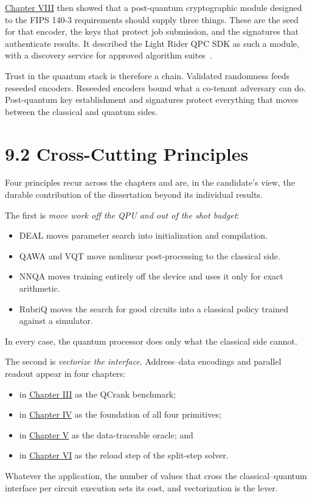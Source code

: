 \documentclass{report}
\theoremstyle{plain}
\theoremstyle{definition}
\theoremstyle{remark}
\begin{document}
\hyperref[ch:pqc]{Chapter VIII} then showed that a post-quantum cryptographic module designed to the FIPS 140-3 requirements should supply three things. These are the seed for that encoder, the keys that protect job submission, and the signatures that authenticate results. It described the Light Rider QPC SDK as such a module, with a discovery service for approved algorithm suites~\cite{guo2026lightriderqpc}.

Trust in the quantum stack is therefore a chain. Validated randomness feeds reseeded encoders. Reseeded encoders bound what a co-tenant adversary can do. Post-quantum key establishment and signatures protect everything that moves between the classical and quantum sides.

\section{9.2 Cross-Cutting Principles}\label{sec:conclusion:principles}

Four principles recur across the chapters and are, in the candidate's view, the durable contribution of the dissertation beyond its individual results.

The first is \emph{move work off the QPU and out of the shot budget}:
\begin{itemize}
  \item DEAL moves parameter search into initialization and compilation.
  \item QAWA and VQT move nonlinear post-processing to the classical side.
  \item NNQA moves training entirely off the device and uses it only for exact arithmetic.
  \item RubriQ moves the search for good circuits into a classical policy trained against a simulator.
\end{itemize}
In every case, the quantum processor does only what the classical side cannot.

The second is \emph{vectorize the interface}. Address--data encodings and parallel readout appear in four chapters:
\begin{itemize}
  \item in \hyperref[ch:qgear]{Chapter III} as the QCrank benchmark;
  \item in \hyperref[ch:qml]{Chapter IV} as the foundation of all four primitives;
  \item in \hyperref[ch:nisq]{Chapter V} as the data-traceable oracle; and
  \item in \hyperref[ch:synthesis]{Chapter VI} as the reload step of the split-step solver.
\end{itemize}
Whatever the application, the number of values that cross the classical--quantum interface per circuit execution sets its cost, and vectorization is the lever.
\end{document}
